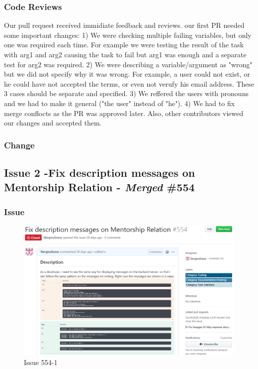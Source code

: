 \documentclass{article}
\begin{document}
\subsubsection{Code Reviews}
\hspace{0.5cm}Our pull request received immidiate feedback and reviews. our first PR needed some important changes:
1) We were checking multiple failing variables, but only one was required each time. For example we were testing the result of the task with arg1 and arg2 causing the task to fail but arg1 was enough and a separate test for arg2 was required. 
2) We were describing a variable/argument as "wrong" but we did not specify why it was wrong. For example, a user could not exist, or he could have not accepted the terms, or even not verufy his email address. These 3 cases should be separate and specified.
3) We reffered the users with pronouns and we had to make it general ("the user" instead of "he").
4) We had to fix merge conflocts as the PR was approved later.
 Also, other contributors viewed our changes and accepted them. 
\subsubsection{Change}

\subsection{Issue 2 -Fix description messages on Mentorship Relation - \emph{Merged} \#554}
\subsubsection{Issue}
\begin{figure}[tph!]
\centerline{\includegraphics[totalheight=13cm, width=16cm]{issue554part1.png}}
    \caption{Issue 554-1}
    \label{fig:verticalcell}
\end{figure}
\end{document}
